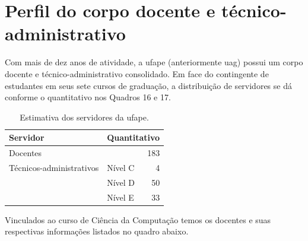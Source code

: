 \documentclass[
	12pt,				%
	openright,			%
  oneside,     %
	a4paper,			%
 hyphens,
	chapter=TITLE,		%
	english,			%
	french,				%
	spanish,			%
	brazil				%
	]{abntex2}
\begin{document}
%
%



\chapter{Perfil do corpo docente e técnico-administra\-ti\-vo}

Com mais de dez anos de atividade, a \acrshort{ufape} (anteriormente \acrshort{uag}) possui um corpo docente e técnico-administrativo consolidado. Em face do contingente de estudantes em seus sete cursos de graduação, a distribuição de servidores se dá conforme o quantitativo nos Quadros 16 e 17.

\begin{center}
  
  \begin{scriptsize}
    \begin{longtable}{llr}
      \caption{\label{quadro:estimativa-servidores-ufape}Estimativa dos servidores da \acrshort{ufape}.}\\
  \toprule
  \textbf{Servidor} & \multicolumn{2}{l}{\textbf{Quantitativo}}\\ 
    \midrule
    Docentes                 & \multicolumn{2}{r}{183} \\ \midrule
    Técnicos-administrativos & Nível C & 4 \\ 
                             & Nível D & 50 \\ 
                             & Nível E & 33 \\
    \bottomrule
\end{longtable}
\end{scriptsize}      
\end{center}
Vinculados ao curso de Ciência da Computação temos os docentes e suas respectivas informações listados no quadro abaixo.
\end{document}
